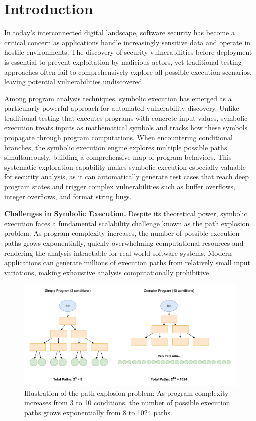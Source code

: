 \chapter{Introduction}

In today's interconnected digital landscape, software security has become a critical concern as applications handle increasingly sensitive data and operate in hostile environments. The discovery of security vulnerabilities before deployment is essential to prevent exploitation by malicious actors, yet traditional testing approaches often fail to comprehensively explore all possible execution scenarios, leaving potential vulnerabilities undiscovered.

Among program analysis techniques, symbolic execution has emerged as a particularly powerful approach for automated vulnerability discovery. Unlike traditional testing that executes programs with concrete input values, symbolic execution treats inputs as mathematical symbols and tracks how these symbols propagate through program computations. When encountering conditional branches, the symbolic execution engine explores multiple possible paths simultaneously, building a comprehensive map of program behaviors. This systematic exploration capability makes symbolic execution especially valuable for security analysis, as it can automatically generate test cases that reach deep program states and trigger complex vulnerabilities such as buffer overflows, integer overflows, and format string bugs.

\textbf{Challenges in Symbolic Execution.} Despite its theoretical power, symbolic execution faces a fundamental scalability challenge known as the path explosion problem. As program complexity increases, the number of possible execution paths grows exponentially, quickly overwhelming computational resources and rendering the analysis intractable for real-world software systems. Modern applications can generate millions of execution paths from relatively small input variations, making exhaustive analysis computationally prohibitive.

\begin{figure}[htbp]
    \centering
    \includegraphics[width=\textwidth]{Figures/path_explosion_problem}
    \caption{Illustration of the path explosion problem: As program complexity increases from 3 to 10 conditions, the number of possible execution paths grows exponentially from 8 to 1024 paths.}
    \label{fig:path_explosion_problem}
\end{figure}

